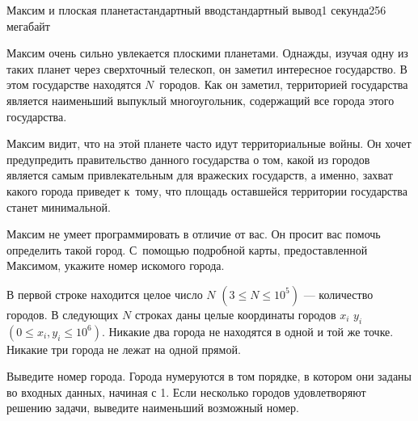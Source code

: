\begin{problem}{Максим и плоская планета}{стандартный ввод}{стандартный вывод}{1 секунда}{256 мегабайт}

Максим очень сильно увлекается плоскими планетами. Однажды, изучая одну из таких планет через сверхточный телескоп, он заметил интересное государство. В этом государстве находятся $N$~городов. Как он заметил, территорией государства является наименьший выпуклый многоугольник, содержащий все города этого государства.

Максим видит, что на этой планете часто идут территориальные войны. Он хочет предупредить правительство данного государства о том, какой из городов является самым привлекательным для вражеских государств, а именно, захват какого города приведет к~тому, что площадь оставшейся территории государства станет минимальной.

Максим не умеет программировать в отличие от вас. Он просит вас помочь определить такой город. С~помощью подробной карты, предоставленной Максимом, укажите номер искомого города.


\InputFile
В первой строке находится целое число $N$ $(3 \leq N \leq 10^5)$ --- количество городов. В следующих $N$ строках даны целые координаты городов $x_i$ $y_i$ $(0 \leq x_i, y_i \leq 10^6)$. Никакие два города не находятся в одной и той же точке. Никакие три города не лежат на одной прямой.

\OutputFile
Выведите номер города. Города нумеруются в том порядке, в котором они заданы во входных данных, начиная с 1. Если несколько городов удовлетворяют решению задачи, выведите наименьший возможный номер.

\Example

\begin{example}
%
\end{example}

\end{problem}

